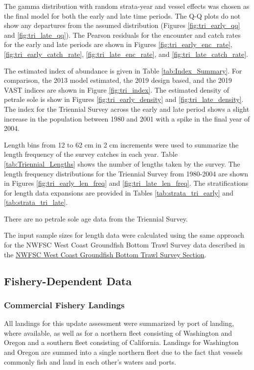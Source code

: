 \documentclass[12pt,]{article}
\begin{document}
The gamma distribution with random strata-year and vessel effects was
chosen as the final model for both the early and late time periods. The
Q-Q plots do not show any departures from the assumed distribution
(Figures \ref{fig:tri_early_qq} and \ref{fig:tri_late_qq}). The Pearson
residuals for the encounter and catch rates for the early and late
periods are shown in Figures \ref{fig:tri_early_enc_rate},
\ref{fig:tri_early_catch_rate}, \ref{fig:tri_late_enc_rate}, and
\ref{fig:tri_late_catch_rate}.

The estimated index of abundance is given in Table
\ref{tab:Index_Summary}. For comparison, the 2013 model estimated, the
2019 design based, and the 2019 VAST indices are shown in Figure
\ref{fig:tri_index}. The estimated density of petrale sole is show in
Figures \ref{fig:tri_early_density} and \ref{fig:tri_late_density}. The
index for the Triennial Survey across the early and late period shows a
slight increase in the population between 1980 and 2001 with a spike in
the final year of 2004.

Length bins from 12 to 62 cm in 2 cm increments were used to summarize
the length frequency of the survey catches in each year. Table
\ref{tab:Triennial_Lengths} shows the number of lengths taken by the
survey. The length frequency distributions for the Triennial Survey from
1980-2004 are shown in Figures \ref{fig:tri_early_len_freq} and
\ref{fig:tri_late_len_freq}. The stratifications for length data
expansions are provided in Tables \ref{tab:strata_tri_early} and
\ref{tab:strata_tri_late}.

There are no petrale sole age data from the Triennial Survey.

The input sample sizes for length data were calculated using the same
approach for the NWFSC West Coast Groundfish Bottom Trawl Survey data
described in the \protect\hyperlink{nwfsc_survey}{NWFSC West Coast
Groundfish Bottom Trawl Survey Section}.

\subsection{Fishery-Dependent Data}\label{fishery-dependent-data}

\subsubsection{Commercial Fishery
Landings}\label{commercial-fishery-landings}

All landings for this update assessment were summarized by port of
landing, where available, as well as for a northern fleet consisting of
Washington and Oregon and a southern fleet consisting of California.
Landings for Washington and Oregon are summed into a single northern
fleet due to the fact that vessels commonly fish and land in each
other's waters and ports.
\end{document}
